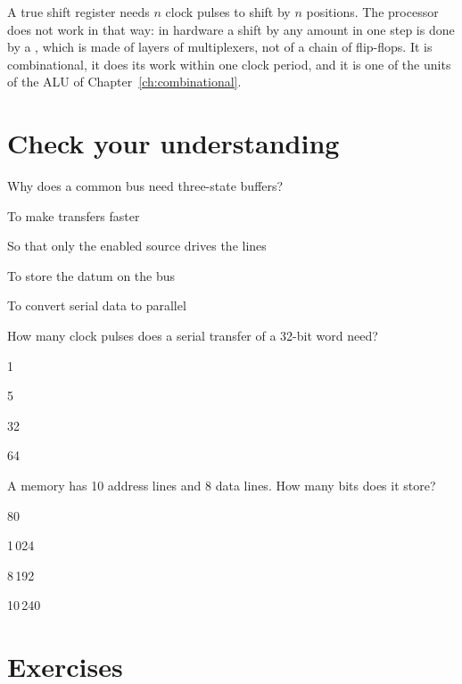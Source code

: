 A true shift register needs $n$ clock pulses to shift by $n$ positions. The
processor does not work in that way: in hardware a shift by any amount in one
step is done by a , which is made of layers of
multiplexers, not of a chain of flip-flops. It is combinational, it does its
work within one clock period, and it is one of the units of the ALU of
Chapter~\ref{ch:combinational}.





\section{Check your understanding}

\begin{quiz}{Why does a common bus need three-state buffers?}
\item To make transfers faster
\item So that only the enabled source drives the lines
\item To store the datum on the bus
\item To convert serial data to parallel
\end{quiz}

\begin{quiz}{How many clock pulses does a serial transfer of a 32-bit word need?}
\item 1
\item 5
\item 32
\item 64
\end{quiz}

\begin{quiz}{A memory has 10 address lines and 8 data lines. How many bits does it store?}
\item 80
\item 1\,024
\item 8\,192
\item 10\,240
\end{quiz}

\section{Exercises}

